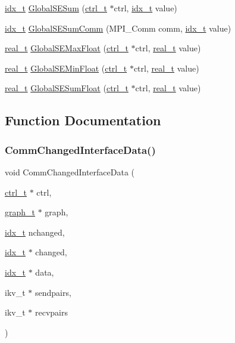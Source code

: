 \begin{DoxyCompactItemize}
\item 
\hyperlink{a00876_aaa5262be3e700770163401acb0150f52}{idx\+\_\+t} \hyperlink{a00344_a3436cdd78aad4086a1df7cd254a7f2f9}{Global\+S\+E\+Sum} (\hyperlink{a00742}{ctrl\+\_\+t} $\ast$ctrl, \hyperlink{a00876_aaa5262be3e700770163401acb0150f52}{idx\+\_\+t} value)
\item 
\hyperlink{a00876_aaa5262be3e700770163401acb0150f52}{idx\+\_\+t} \hyperlink{a00344_a10c4011516ef455e5c128a4112cf2cea}{Global\+S\+E\+Sum\+Comm} (M\+P\+I\+\_\+\+Comm comm, \hyperlink{a00876_aaa5262be3e700770163401acb0150f52}{idx\+\_\+t} value)
\item 
\hyperlink{a00876_a1924a4f6907cc3833213aba1f07fcbe9}{real\+\_\+t} \hyperlink{a00344_ad62cb5f0c141a2535d0f6eca6588a1c5}{Global\+S\+E\+Max\+Float} (\hyperlink{a00742}{ctrl\+\_\+t} $\ast$ctrl, \hyperlink{a00876_a1924a4f6907cc3833213aba1f07fcbe9}{real\+\_\+t} value)
\item 
\hyperlink{a00876_a1924a4f6907cc3833213aba1f07fcbe9}{real\+\_\+t} \hyperlink{a00344_ab1ebf8b04ebb66e2a28e603f249d9ca8}{Global\+S\+E\+Min\+Float} (\hyperlink{a00742}{ctrl\+\_\+t} $\ast$ctrl, \hyperlink{a00876_a1924a4f6907cc3833213aba1f07fcbe9}{real\+\_\+t} value)
\item 
\hyperlink{a00876_a1924a4f6907cc3833213aba1f07fcbe9}{real\+\_\+t} \hyperlink{a00344_a6cd212bae78535674c941b90373d6b0b}{Global\+S\+E\+Sum\+Float} (\hyperlink{a00742}{ctrl\+\_\+t} $\ast$ctrl, \hyperlink{a00876_a1924a4f6907cc3833213aba1f07fcbe9}{real\+\_\+t} value)
\end{DoxyCompactItemize}


\subsection{Function Documentation}
\mbox{\label{a00344_adc12fed8c165f50572b6704789b0a962}} 
\subsubsection{\texorpdfstring{Comm\+Changed\+Interface\+Data()}{CommChangedInterfaceData()}}
{\footnotesize\ttfamily void Comm\+Changed\+Interface\+Data (\begin{DoxyParamCaption}\item[{\hyperlink{a00742}{ctrl\+\_\+t} $\ast$}]{ctrl,  }\item[{\hyperlink{a00734}{graph\+\_\+t} $\ast$}]{graph,  }\item[{\hyperlink{a00876_aaa5262be3e700770163401acb0150f52}{idx\+\_\+t}}]{nchanged,  }\item[{\hyperlink{a00876_aaa5262be3e700770163401acb0150f52}{idx\+\_\+t} $\ast$}]{changed,  }\item[{\hyperlink{a00876_aaa5262be3e700770163401acb0150f52}{idx\+\_\+t} $\ast$}]{data,  }\item[{ikv\+\_\+t $\ast$}]{sendpairs,  }\item[{ikv\+\_\+t $\ast$}]{recvpairs }\end{DoxyParamCaption})}


